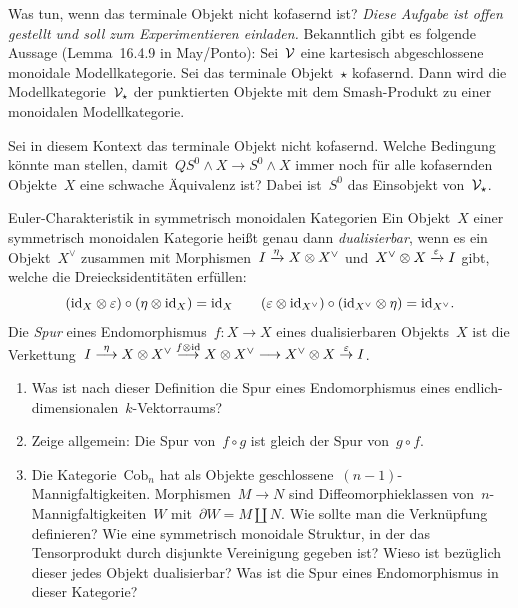 \documentclass{uebblatt}
\begin{document}
\enlargethispage{1em}

\begin{aufgabe}{Was tun, wenn das terminale Objekt nicht kofasernd ist?}
\emph{Diese Aufgabe ist offen gestellt und soll zum Experimentieren einladen.}
Bekanntlich gibt es folgende Aussage (Lemma~16.4.9 in May/Ponto): Sei~$\mathcal{V}$ eine
kartesisch abgeschlossene monoidale Modellkategorie. Sei das terminale
Objekt~$\star$ kofasernd. Dann wird die Modellkategorie~$\mathcal{V}_\star$ der punktierten
Objekte mit dem Smash-Produkt zu einer monoidalen Modellkategorie.

Sei in diesem Kontext das terminale Objekt nicht kofasernd. Welche Bedingung könnte man
stellen, damit~$QS^0 \wedge X \to S^0 \wedge X$ immer noch für alle kofasernden
Objekte~$X$ eine schwache Äquivalenz ist? Dabei ist~$S^0$ das Einsobjekt
von~$\mathcal{V}_\star$.
\end{aufgabe}

\begin{aufgabe}{Euler-Charakteristik in symmetrisch monoidalen Kategorien}
Ein Objekt~$X$ einer symmetrisch monoidalen Kategorie heißt genau dann
\emph{dualisierbar}, wenn es ein Objekt~$X^\vee$ zusammen mit Morphismen~$I
\xrightarrow{\eta} X \otimes X^\vee$ und~$X^\vee \otimes X \xrightarrow{\varepsilon} I$ gibt,
welche die Dreiecksidentitäten erfüllen:
\[ (\mathrm{id}_X \otimes \varepsilon) \circ (\eta \otimes \mathrm{id}_X) = \mathrm{id}_X \qquad
  (\varepsilon \otimes \mathrm{id}_{X^\vee}) \circ (\mathrm{id}_{X^\vee} \otimes \eta) = \mathrm{id}_{X^\vee}. \]
Die \emph{Spur} eines Endomorphismus~$f : X \to X$ eines dualisierbaren
Objekts~$X$ ist die Verkettung~$I \stackrel{\eta}{\longrightarrow} X \otimes X^\vee
\stackrel{f \otimes \mathrm{id}}{\longrightarrow} X \otimes X^\vee \longrightarrow X^\vee \otimes X
\stackrel{\varepsilon}{\to} I$.
\begin{enumerate}
\item Was ist nach dieser Definition die Spur eines Endomorphismus eines
endlich-dimensionalen~$k$-Vektorraums?
\item Zeige allgemein: Die Spur von~$f \circ g$ ist gleich der Spur von~$g
\circ f$.
\item Die Kategorie~$\mathrm{Cob}_n$ hat als Objekte
geschlossene~$(n-1)$-Mannigfaltigkeiten. Morphismen~$M \to N$
sind Diffeomorphieklassen von~$n$-Mannigfaltigkeiten~$W$ mit~$\partial W = M
\amalg N$. Wie sollte man die Verknüpfung definieren? Wie eine symmetrisch
monoidale Struktur, in der das Tensorprodukt durch disjunkte Vereinigung
gegeben ist? Wieso ist bezüglich dieser jedes Objekt dualisierbar? Was
ist die Spur eines Endomorphismus in dieser Kategorie?
\end{enumerate}
\end{aufgabe}
\end{document}
